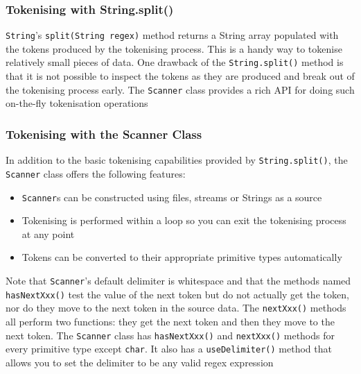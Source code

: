\subsubsection{Tokenising with String.split()}
\verb#String#'s \verb#split(String regex)# method returns a String array 
populated with the tokens produced by the tokenising process. This is a handy 
way to tokenise relatively small pieces of data. One drawback of the 
\verb#String.split()# method is that it is not possible to inspect the tokens 
as they are produced and break out of the tokenising process early. The 
\verb#Scanner# class provides a rich API for doing such on-the-fly tokenisation 
operations

\subsubsection{Tokenising with the Scanner Class}
In addition to the basic tokenising capabilities provided by 
\verb#String.split()#, the \verb#Scanner# class offers the following features:
\begin{itemize}
    \item \verb#Scanner#s can be constructed using files, streams or Strings as 
    a source
    \item Tokenising is performed within a loop so you can exit the tokenising 
    process at any point
    \item Tokens can be converted to their appropriate primitive types 
    automatically
\end{itemize}
Note that \verb#Scanner#'s default delimiter is whitespace and that the methods 
named \verb#hasNextXxx()# test the value of the next token but do not actually 
get the token, nor do they move to the next token in the source data. The 
\verb#nextXxx()# methods all perform two functions: they get the next token and 
then they move to the next token. The \verb#Scanner# class has 
\verb#hasNextXxx()# and \verb#nextXxx()# methods for every primitive type 
except \verb#char#. It also has a \verb#useDelimiter()# method that allows you 
to set the delimiter to be any valid regex expression

